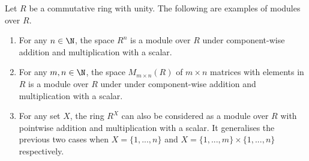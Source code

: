 \begin{example}
  Let $R$ be a commutative ring with unity.
  The following are examples of modules over $R$.
  \begin{enumerate}
    \item
      For any $n \in \N$, the space $R^n$ is a module over $R$ under
      component-wise addition and multiplication with a scalar.
    \item
      For any $m, n \in \N$, the space $M_{m \times n}(R)$ of $m \times n$
      matrices with elements in $R$ is a module over $R$ under under
      component-wise addition and multiplication with a scalar.
    \item
      For any set $X$, the ring $R^X$ can also be considered as a module over
      $R$ with pointwise addition and multiplication with a scalar.
      It generalises the previous two cases when $X = \{1, ..., n\}$ and
      $X = \{1, ..., m\} \times \{1, ..., n\}$ respectively.
  \end{enumerate}
\end{example}
